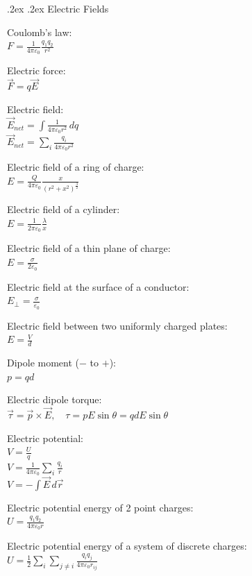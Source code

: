 \documentclass[10pt,landscape,a4paper]{article}
\makeatletter
\renewcommand{\section}{\@startsection{section}{1}{0mm}%
  {.2ex}%
  {.2ex}%
  {\color{myblue}\sffamily\small\bfseries}}
\makeatother
\begin{document}
\begin{multicols*}{5}
  \section{Electric Fields}

  Coulomb's law: \\
  \(F = \frac{1}{4 \pi \varepsilon_0} \frac{q_1 q_2}{r^2}\)

  Electric force: \\
  \(\vec{F} = q \vec{E}\)

  Electric field: \\
  \(\vec{E}_{net} = \int \frac{1}{4 \pi \varepsilon_0 r^2} \, dq\) \\
  \(\vec{E}_{net} = \sum_i \frac{q_i}{4 \pi \varepsilon_0 r^2}\)

  Electric field of a ring of charge: \\
  \(E = \frac{Q}{4 \pi \varepsilon_0} \frac{x}{(r^2 +x^2)^{\frac{3}{2}}}\)

  Electric field of a cylinder: \\
  \(E = \frac{1}{2 \pi \varepsilon_0} \frac{\lambda}{x}\)

  Electric field of a thin plane of charge: \\
  \(E = \frac{\sigma}{2 \varepsilon_0}\)

  Electric field at the surface of a conductor: \\
  \(E_{\perp} = \frac{\sigma}{\varepsilon_0}\)

  Electric field between two uniformly charged plates: \\
  \(E = \frac{V}{d}\)

  Dipole moment (\(-\) to \(+\)): \\
  \(p = qd\)

  Electric dipole torque: \\
  \(\vec{\tau} = \vec{p} \times \vec{E}, \quad \tau = pE \sin \theta = qd E \sin \theta\)

  Electric potential: \\
  \(V = \frac{U}{q}\) \\
  \(V = \frac{1}{4 \pi \varepsilon_0} \sum_i \frac{q_i}{r}\) \\
  \(V = - \int \vec{E} \, d \vec{r}\)

  Electric potential energy of 2 point charges: \\
  \(U = \frac{q_1 q_2}{4 \pi \varepsilon_0 r}\)

  Electric potential energy of a system of discrete charges: \\
  \(U = \frac{1}{2} \sum_i \sum_{j \ne i} \frac{q_i q_j}{4 \pi \varepsilon_0 r_{ij}}\)


\end{multicols*}
\end{document}
